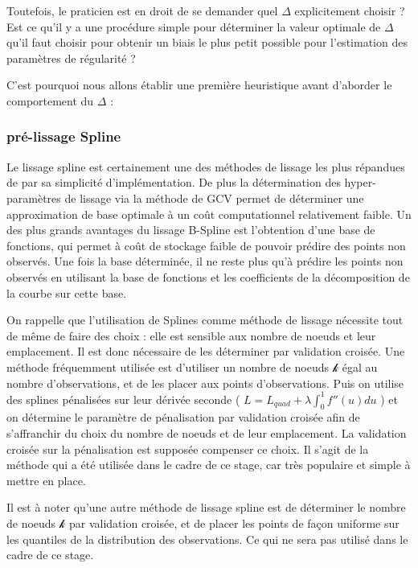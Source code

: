 \smallskip

Toutefois, le praticien est en droit de se demander quel $\Delta$ explicitement choisir ? Est ce qu'il y a une procédure simple pour déterminer la valeur optimale de $\Delta$ qu'il faut choisir pour obtenir un biais le plus petit possible pour l'estimation des paramètres de régularité ?


C'est pourquoi nous allons établir une première heuristique avant d'aborder le comportement du $\Delta$ :

\subsubsection{pré-lissage Spline}

Le lissage spline est certainement une des méthodes de lissage les plus répandues de par sa simplicité d'implémentation. De plus la détermination des hyper-paramètres de lissage via la méthode de GCV permet de déterminer une approximation de base optimale à un coût computationnel relativement faible. Un des plus grands avantages du lissage B-Spline est l'obtention d'une base de fonctions, qui permet à coût de stockage faible de pouvoir prédire des points non observés. Une fois la base déterminée, il ne reste plus qu'à prédire les points non observés en utilisant la base de fonctions et les coefficients de la décomposition de la courbe sur cette base.

\bigskip

On rappelle que l'utilisation de Splines comme méthode de lissage nécessite tout de même de faire des choix : elle est sensible aux nombre de noeuds et leur emplacement. Il est donc nécessaire de les déterminer par validation croisée. Une méthode fréquemment utilisée est d'utiliser un nombre de noeuds $\mathcal k$ égal au nombre d'observations, et de les placer aux points d'observations. Puis on utilise des splines pénalisées sur leur dérivée seconde ( $L = L_{quad} + \lambda \displaystyle\int_0^1 f''(u) du$ ) et on détermine le paramètre de pénalisation par validation croisée afin de s'affranchir du choix du nombre de noeuds et de leur emplacement. La validation croisée sur la pénalisation est supposée compenser ce choix. Il s'agit de la méthode qui a été utilisée dans le cadre de ce stage, car très populaire et simple à mettre en place.

Il est à noter qu'une autre méthode de lissage spline est de déterminer le nombre de noeuds $\mathcal k$ par validation croisée, et de placer les points de façon uniforme sur les quantiles de la distribution des observations. Ce qui ne sera pas utilisé dans le cadre de ce stage.

